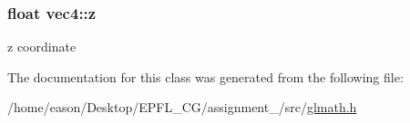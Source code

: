 \subsubsection[{\texorpdfstring{z}{z}}]{\setlength{\rightskip}{0pt plus 5cm}float vec4\+::z}\hypertarget{classvec4_a12b318751110db034dddc450cdec455d}{}\label{classvec4_a12b318751110db034dddc450cdec455d}


z coordinate 



The documentation for this class was generated from the following file\+:\begin{DoxyCompactItemize}
\item 
/home/eason/\+Desktop/\+E\+P\+F\+L\+\_\+\+C\+G/assignment\+\_/src/\hyperlink{glmath_8h}{glmath.\+h}\end{DoxyCompactItemize}

